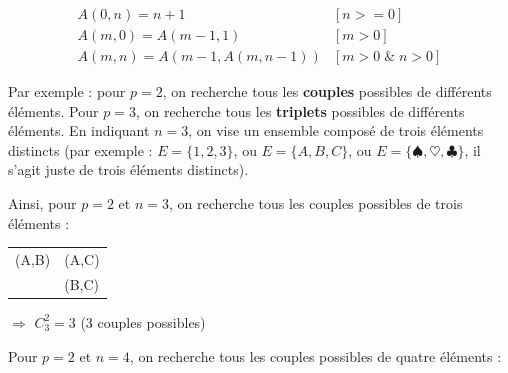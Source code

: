 \documentclass[11pt,a4paper]{article}
\begin{document}

\bigskip


\begin{equation*}
  \begin{aligned}
& A(0, n) = n + 1                 &  [n >= 0] & \\
& A(m, 0) = A(m - 1, 1)           &  [m > 0]  & \\
& A(m, n) = A(m - 1, A(m, n - 1)) &  [m > 0 \; \& \; n > 0] &
  \end{aligned}
\end{equation*}

\bigskip


\bigskip

Par exemple : pour $ p = 2 $, on recherche tous les \textbf{couples} possibles de différents éléments.
Pour $ p = 3 $, on recherche tous les \textbf{triplets} possibles de différents éléments.
En indiquant $ n = 3 $, on vise un ensemble composé de trois éléments distincts (par exemple : $ E = \{ 1, 2, 3 \} $, ou $ E = \{ A, B, C \} $, ou $ E = \{ \spadesuit, \heartsuit, \clubsuit \} $, il s'agit juste de trois éléments distincts).

\newpage

Ainsi, pour $ p = 2 $ et $ n = 3 $, on recherche tous les couples possibles de trois éléments :

\begin{table}[h!]
  \centering
  \begin{tabular}{l l}
(A,B) & (A,C) \\
      & (B,C)
  \end{tabular}
\end{table}

\hspace*{3cm} $\Rightarrow$ $ C^{2}_{3} = 3 $ \hspace*{1cm} (3 couples possibles)

\bigskip

Pour $ p = 2 $ et $ n = 4 $, on recherche tous les couples possibles de quatre éléments :
\end{document}
